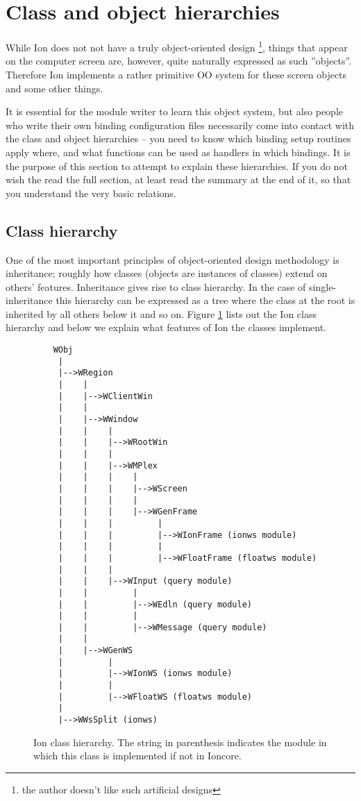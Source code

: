 
\section{Class and object hierarchies}
\label{sec:objects}

While Ion does not not have a truly object-oriented design
\footnote{the author doesn't like such artificial designs},
things that appear on the computer screen are, however, quite
naturally expressed as such ''objects''. Therefore Ion implements
a rather primitive OO system for these screen objects and some
other things. 

It is essential for the module writer to learn this object
system, but also people who write their own binding configuration files
necessarily come into contact with the class and object hierarchies
-- you need to know which binding setup routines apply where, 
and what functions can be used as handlers in which bindings.
It is the purpose of this section to attempt to explain these 
hierarchies. If you do not wish the read the full section, at least
read the summary at the end of it, so that you understand the very
basic relations.


\subsection{Class hierarchy}

One of the most important principles of object-oriented design methodology
is inheritance; roughly how classes (objects are instances of classes)
extend on others' features. Inheritance gives rise to class hierarchy.
In the case of single-inheritance this hierarchy can be expressed as a
tree where the class at the root is inherited by all others below it
and so on. Figure \ref{fig:classhierarchy} lists out the Ion class 
hierarchy and below we explain what features of Ion the classes 
implement. 

\begin{figure}
\begin{htmlonly}
\docode %
\end{htmlonly}
\begin{verbatim}
    WObj
     |
     |-->WRegion
     |    |
     |    |-->WClientWin
     |    |
     |    |-->WWindow
     |    |    |
     |    |    |-->WRootWin
     |    |    |
     |    |    |-->WMPlex
     |    |    |    |
     |    |    |    |-->WScreen
     |    |    |    |
     |    |    |    |-->WGenFrame
     |    |    |         |
     |    |    |         |-->WIonFrame (ionws module)
     |    |    |         |
     |    |    |         |-->WFloatFrame (floatws module)
     |    |    |
     |    |    |-->WInput (query module)
     |    |         |
     |    |         |-->WEdln (query module)
     |    |         |
     |    |         |-->WMessage (query module)
     |    |
     |    |-->WGenWS
     |         |
     |         |-->WIonWS (ionws module)
     |         |
     |         |-->WFloatWS (floatws module)
     |
     |-->WWsSplit (ionws)
\end{verbatim}
\caption{Ion class hierarchy. The string in parenthesis indicates
  the module in which this class is implemented if not in Ioncore.}
\label{fig:classhierarchy}
\end{figure}

